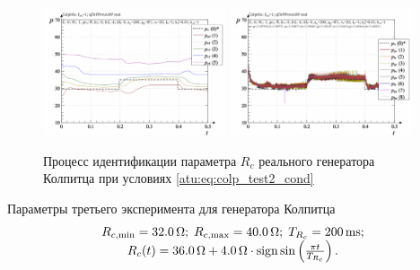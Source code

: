 \begin{figure}[htb!]
  \centerline{
    \includegraphics[width=0.48\textwidth]{p/r/colp_real_id-p_t_pi_ql3rlWvnAAW_real_d_1.png}
    \hfill
    \includegraphics[width=0.48\textwidth]{p/r/colp_real_id-p_t_p_ql3rlWvnAAW_real_d_1.png}
  }
  \caption{Процесс идентификации параметра $R_c$ реального генератора Колпитца при условиях \ref{atu:eq:colp_test2_cond} }
  \label{atu:f:colp_r_id_2}
\end{figure}


Параметры третьего эксперимента для генератора Колпитца
%
\begin{equation}
  \begin{array}{c}
    R_{c,\min} = \SI{32.0}{\ohm};
    \;
    R_{c,\max} = \SI{40.0}{\ohm};
    \;
    T_{R_c} = \SI{200}{\milli\second};
  \\
    R_c(t) = \SI{36.0}{\ohm} + \SI{4.0}{\ohm} \cdot \operatorname*{sign} \sin \left(   \frac{\pi t}{T_{R_c}}   \right).
  \end{array}
  \label{atu:eq:colp_test3_cond}
\end{equation}


